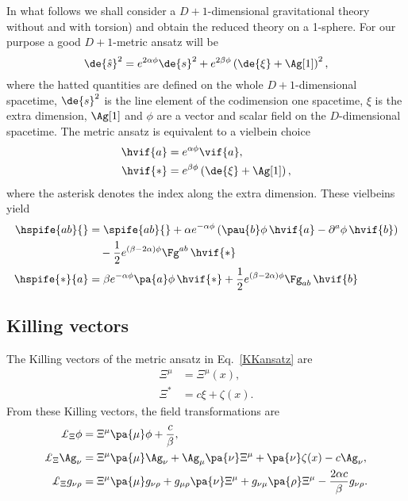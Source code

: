\documentclass[aps,prd,12pt,superscriptaddress,showpacs,showkeys,reprint]{revtex4-1}
\begin{document}
In what follows we shall consider a $D+1$-dimensional gravitational theory without and with torsion) and obtain the reduced theory on a 1-sphere. For our purpose a good $D+1$-metric ansatz will be~\cite{Duff:1986hr,PopeKK}
\begin{equation}
  \de{\hat{s}}^2 = e^{2\alpha\phi} \de{s}^2 + e^{2 \beta \phi} \left( \de{\xi} + \Ag[1] \right)^2,
  \label{KKansatz}
\end{equation}
where the hatted quantities are defined on the whole $D+1$-dimensional spacetime, $\de{s}^2$ is the line element of the codimension one spacetime, $\xi$ is the extra dimension, $\Ag[1]$ and $\phi$ are a vector and scalar field on the $D$-dimensional spacetime. The metric ansatz is equivalent to a vielbein choice
\begin{equation}
    \label{vif-anz}
  \begin{split}
    \hvif{a} &= e^{\alpha \phi} \vif{a}, \\
    \hvif{*} &= e^{\beta \phi} \left( \de{\xi} + \Ag[1] \right),
  \end{split}
\end{equation}
where the asterisk denotes the index along the extra dimension. These vielbeins yield 
\begin{equation}
  \begin{split}
    \hspife{ab}{} &= \spife{ab}{} + \alpha e^{-\alpha \phi} \left( \pau{b} \phi \, \hvif{a} - \partial^{a} \phi \, \hvif{b} \right) \\
    & \quad - \frac{1}{2} e^{(\beta - 2\alpha) \phi} \Fg^{a b} \, \hvif{*}
    \\
    \hspife{*}{a} &= \beta e^{-\alpha \phi} \pa{a} \phi \, \hvif{*} + \frac{1}{2} e^{(\beta - 2\alpha) \phi} \Fg_{a b} \, \hvif{b} 
  \end{split}
\end{equation}

\subsection*{Killing vectors}

The Killing vectors of the metric ansatz in Eq.~\eqref{KKansatz} are 
\begin{equation}
  \begin{split}
    \Xi^\mu &= \Xi^\mu(x), \\
    \Xi^*  &= c \xi + \zeta(x).
  \end{split}
  \label{Kvector}
\end{equation}
From these Killing vectors, the field transformations are
\begin{align}
  \label{Liephi}
  \pounds_\Xi \phi    &= \Xi^\mu \pa{\mu} \phi + \frac{c}{\beta}, \\
  \label{LieA}
  \pounds_\Xi \Ag_\nu  &= \Xi^\mu \pa{\mu} \Ag_\nu + \Ag_\mu \pa{\nu} \Xi^\mu + \pa{\nu} \zeta(x) - c \Ag_\nu, \\
  \label{Lieg}
  \pounds_\Xi g_{\nu\rho} &= \Xi^\mu \pa{\mu} g_{\nu\rho} + g_{\mu\rho} \pa{\nu} \Xi^\mu + g_{\nu\mu} \pa{\rho} \Xi^\mu - \frac{2\alpha c}{\beta} g_{\nu\rho}.
\end{align}
\end{document}
